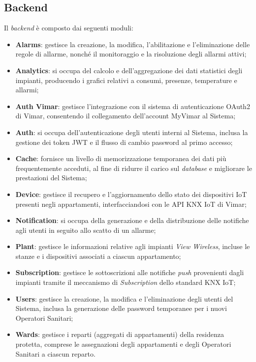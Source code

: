 \documentclass[10pt, letterpaper]{article}
\begin{document}
\subsection{Backend}
Il \textit{backend} è composto dai seguenti moduli:
\begin{itemize}
    \item \textbf{Alarms}: gestisce la creazione, la modifica, l'abilitazione e l'eliminazione 
    delle regole di allarme, nonché il monitoraggio e la risoluzione degli allarmi attivi;
    \item \textbf{Analytics}: si occupa del calcolo e dell'aggregazione dei dati statistici 
    degli impianti, producendo i grafici relativi a consumi, presenze, temperature e allarmi;
    \item \textbf{Auth Vimar}: gestisce l'integrazione con il sistema di autenticazione 
    OAuth2 di Vimar, consentendo il collegamento dell'account MyVimar al Sistema;
    \item \textbf{Auth}: si occupa dell'autenticazione degli utenti interni al Sistema, 
    inclusa la gestione dei token JWT e il flusso di cambio password al primo accesso;
    \item \textbf{Cache}: fornisce un livello di memorizzazione temporanea dei dati 
    più frequentemente acceduti, al fine di ridurre il carico sul \textit{database} e migliorare 
    le prestazioni del Sistema;
    \item \textbf{Device}: gestisce il recupero e l'aggiornamento dello stato dei dispositivi 
    IoT presenti negli appartamenti, interfacciandosi con le API KNX IoT di Vimar;
    \item \textbf{Notification}: si occupa della generazione e della distribuzione delle 
    notifiche agli utenti in seguito allo scatto di un allarme;
    \item \textbf{Plant}: gestisce le informazioni relative agli impianti \textit{View Wireless}, 
    incluse le stanze e i dispositivi associati a ciascun appartamento;
    \item \textbf{Subscription}: gestisce le sottoscrizioni alle notifiche \textit{push} 
    provenienti dagli impianti tramite il meccanismo di \textit{Subscription} dello standard 
    KNX IoT;
    \item \textbf{Users}: gestisce la creazione, la modifica e l'eliminazione degli utenti 
    del Sistema, inclusa la generazione delle password temporanee per i nuovi Operatori Sanitari;
    \item \textbf{Wards}: gestisce i reparti (aggregati di appartamenti) della residenza protetta, comprese le assegnazioni 
    degli appartamenti e degli Operatori Sanitari a ciascun reparto.
\end{itemize}
\end{document}
